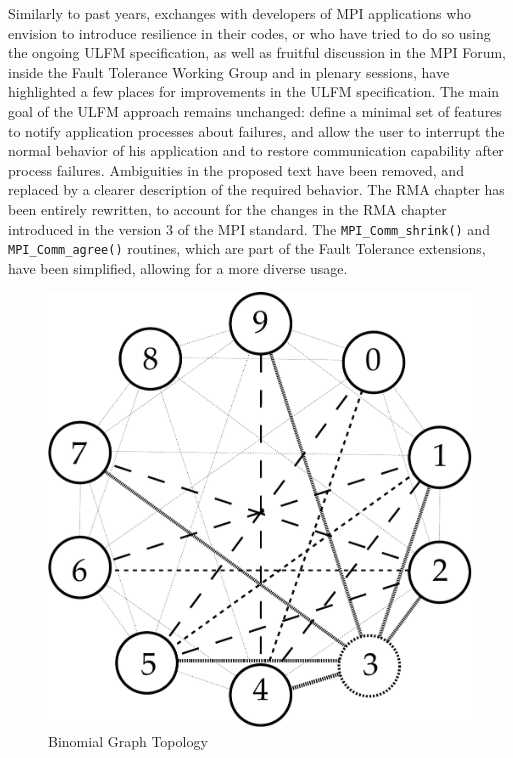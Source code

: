 Similarly to past years, exchanges with developers of MPI applications
who envision to introduce resilience in their codes, or who have tried
to do so using the ongoing ULFM specification, as well as fruitful
discussion in the MPI Forum, inside the Fault Tolerance Working Group
and in plenary sessions, have highlighted a few places for
improvements in the ULFM specification. The main goal of the ULFM
approach remains unchanged: define a minimal set of features to notify
application processes about failures, and allow the user to interrupt
the normal behavior of his application and to restore communication
capability after process failures. Ambiguities in the proposed text
have been removed, and replaced by a clearer description of the
required behavior. The RMA chapter has been entirely rewritten, to
account for the changes in the RMA chapter introduced in the version 3
of the MPI standard. The {\tt MPI\_Comm\_shrink()} and {\tt
MPI\_Comm\_agree()} routines, which are part of the Fault Tolerance
extensions, have been simplified, allowing for a more diverse usage.

\begin{figure}[ht]
\begin{center}
\includegraphics[width=0.5\columnwidth]{Figs/BinomialGraph.pdf}
  \caption{Binomial Graph Topology}
  \label{fig:binomial-graph}
\end{center}
\end{figure}

